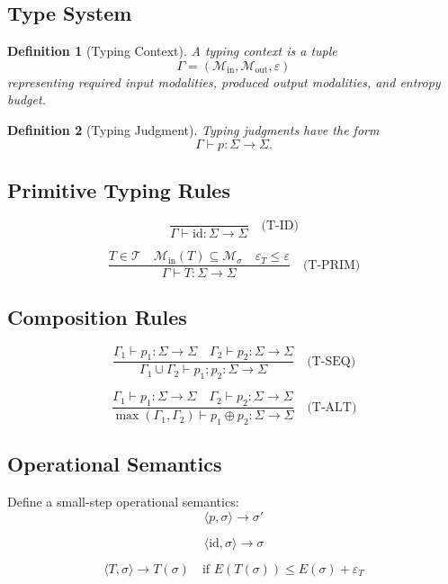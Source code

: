 \documentclass[11pt]{article}
\newtheorem{definition}{Definition}
\begin{document}
\subsection{Type System}

\begin{definition}[Typing Context]
A typing context is a tuple
\[
\Gamma = (\mathcal{M}_{\text{in}}, \mathcal{M}_{\text{out}}, \varepsilon)
\]
representing required input modalities, produced output modalities, and entropy budget.
\end{definition}

\begin{definition}[Typing Judgment]
Typing judgments have the form
\[
\Gamma \vdash p : \Sigma \to \Sigma.
\]
\end{definition}

\subsection{Primitive Typing Rules}

\[
\frac{}{\Gamma \vdash \text{id} : \Sigma \to \Sigma}
\quad
\text{(T-ID)}
\]

\[
\frac{
T \in \mathcal{T}
\quad
\mathcal{M}_{\text{in}}(T) \subseteq \mathcal{M}_\sigma
\quad
\varepsilon_T \le \varepsilon
}{
\Gamma \vdash T : \Sigma \to \Sigma
}
\quad
\text{(T-PRIM)}
\]

\subsection{Composition Rules}

\[
\frac{
\Gamma_1 \vdash p_1 : \Sigma \to \Sigma
\quad
\Gamma_2 \vdash p_2 : \Sigma \to \Sigma
}{
\Gamma_1 \cup \Gamma_2 \vdash p_1 ; p_2 : \Sigma \to \Sigma
}
\quad
\text{(T-SEQ)}
\]

\[
\frac{
\Gamma_1 \vdash p_1 : \Sigma \to \Sigma
\quad
\Gamma_2 \vdash p_2 : \Sigma \to \Sigma
}{
\max(\Gamma_1,\Gamma_2) \vdash p_1 \oplus p_2 : \Sigma \to \Sigma
}
\quad
\text{(T-ALT)}
\]

\subsection{Operational Semantics}

Define a small-step operational semantics:
\[
\langle p, \sigma \rangle \to \sigma'
\]

\[
\langle \text{id}, \sigma \rangle \to \sigma
\]

\[
\langle T, \sigma \rangle \to T(\sigma)
\quad \text{if } E(T(\sigma)) \le E(\sigma) + \varepsilon_T
\]
\end{document}
